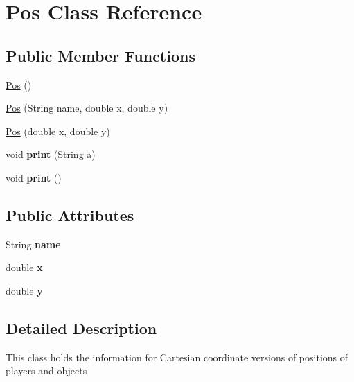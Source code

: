\hypertarget{classPos}{
\section{Pos Class Reference}
\label{classPos}
}
\subsection*{Public Member Functions}
\begin{DoxyCompactItemize}
\item 
\hyperlink{classPos_aaf021a47707aab8c1694998e9c8b348c}{Pos} ()
\item 
\hyperlink{classPos_af8ea76275f120c80f13632807f675861}{Pos} (String name, double x, double y)
\item 
\hyperlink{classPos_a817da99f50ff86348b6fba43d8cfce94}{Pos} (double x, double y)
\item 
\hypertarget{classPos_aee301f27953e7930dac5373d26da24b5}{
void {\bfseries print} (String a)}
\label{classPos_aee301f27953e7930dac5373d26da24b5}

\item 
\hypertarget{classPos_a5c9bfee9b7ed4d7ed03b756e2bfd9fbd}{
void {\bfseries print} ()}
\label{classPos_a5c9bfee9b7ed4d7ed03b756e2bfd9fbd}

\end{DoxyCompactItemize}
\subsection*{Public Attributes}
\begin{DoxyCompactItemize}
\item 
\hypertarget{classPos_aa133a2b2b7579fbb1b56d93655ae66fd}{
String {\bfseries name}}
\label{classPos_aa133a2b2b7579fbb1b56d93655ae66fd}

\item 
\hypertarget{classPos_a05893ff40fd725647e80abb9be6f6f5c}{
double {\bfseries x}}
\label{classPos_a05893ff40fd725647e80abb9be6f6f5c}

\item 
\hypertarget{classPos_aa847265ca29e6803e2cd4ab1d310baa9}{
double {\bfseries y}}
\label{classPos_aa847265ca29e6803e2cd4ab1d310baa9}

\end{DoxyCompactItemize}


\subsection{Detailed Description}
This class holds the information for Cartesian coordinate versions of positions of players and objects 

